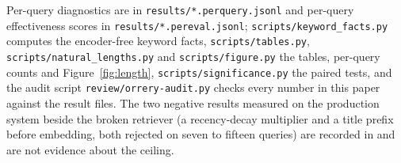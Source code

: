\documentclass[11pt]{article}
\begin{document}
{Per-query diagnostics are in \texttt{results/*.perquery.jsonl} and per-query effectiveness scores in \texttt{results/*.pereval.jsonl}; \texttt{scripts/keyword\_facts.py} computes the encoder-free keyword facts, \texttt{scripts/tables.py}, \texttt{scripts/natural\_lengths.py} and \texttt{scripts/figure.py} the tables, per-query counts and Figure~\ref{fig:length}, \texttt{scripts/significance.py} the paired tests, and the audit script \texttt{review/orrery-audit.py} checks every number in this paper against the result files. The two negative results measured on the production system beside the broken retriever (a recency-decay multiplier and a title prefix before embedding, both rejected on seven to fifteen queries) are recorded in  and are not evidence about the ceiling.
\par}
\end{document}
